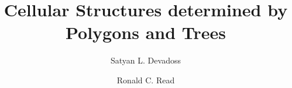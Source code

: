 \documentclass[10pt]{amsart}
\begin{document}
\newcommand{\con} {{\rm config}}
\newcommand{\Con} {{\rm Config}}
\newcommand{\Hu} {{\mathcal H}}                            %
\newcommand{\ba}{{\mathfrak b}}                            %
\newcommand{\sba}{{\mathfrak {sb}}}                        %
\newcommand{\pba}{{\mathfrak {pb}}}                        %
\newcommand{\D} {{\mathfrak D}}                            %
\newcommand{\B} {{\bf B}}                                  %
\newcommand{\Sh} {{\mathcal{S}}}                           %
\newcommand{\Pb} {{\bf P}}                                 %
\newcommand{\C} {{\mathbb C}}                              %
\newcommand{\R} {{\mathbb R}}                              %
\newcommand{\Z} {{\mathbb Z}}                              %
\newcommand{\N} {{\mathbb N}}                              %
\newcommand{\Pj} {{\mathbb P}}                             %
\newcommand{\T} {{\mathbb T}}                              %
\newcommand{\Sg} {\mathbb S}                               %
\newcommand{\sg} {\sigma}                                  %
\newcommand{\Gl} {{\rm Gl}}                                %
\newcommand{\G} {{\mathcal G}}                             %
\newcommand{\IG} {{\mathfrak S}}                           %
\newcommand{\trh} {\kappa}                                 %
\newcommand{\SI} {\ensuremath{SI}}                         %
\newcommand{\la}{{\langle}}                                %
\newcommand{\ra}{{\rangle}}                                %

\theoremstyle{plain}
\newtheorem{thm}{Theorem}[subsection]
\newtheorem{prop}[thm]{Proposition}
\newtheorem{cor}[thm]{Corollary}
\newtheorem{lem}[thm]{Lemma}
\newtheorem{conj}[thm]{Conjecture}

\theoremstyle{definition}
\newtheorem{defn}[thm]{Definition}
\newtheorem{exmp}[thm]{Example}

\theoremstyle{remark}
\newtheorem*{rem}{Remark}
\newtheorem*{hnote}{Historical Note}
\newtheorem*{nota}{Notation}
\newtheorem*{ack}{Acknowledgments}


\title {Cellular Structures determined by Polygons and Trees}

\author{Satyan L. Devadoss}
\author{Ronald C. Read}
\end{document}
